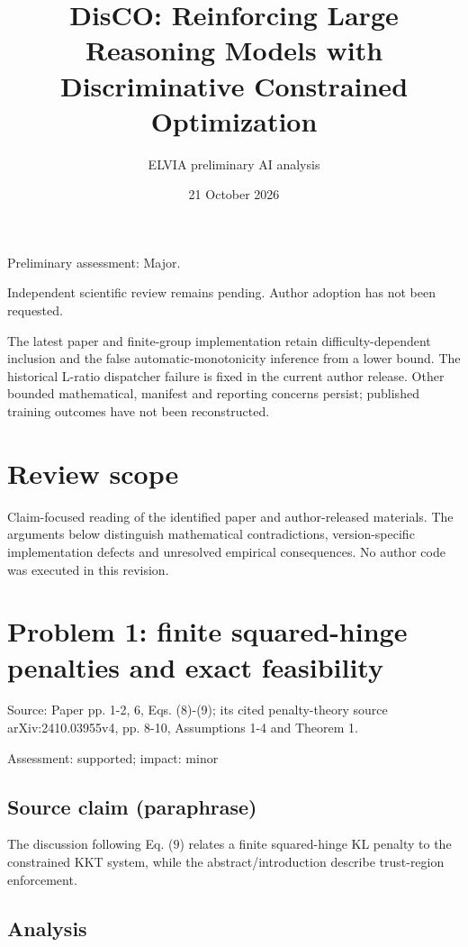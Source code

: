 \documentclass[11pt]{article}
\begin{document}
\title{DisCO: Reinforcing Large Reasoning Models with Discriminative Constrained Optimization}

\author{ELVIA preliminary AI analysis}\date{21 October 2026}\maketitle

Preliminary assessment: Major.\par

Independent scientific review remains pending. Author adoption has not been requested.

The latest paper and finite-group implementation retain difficulty-dependent inclusion and the false automatic-monotonicity inference from a lower bound. The historical L-ratio dispatcher failure is fixed in the current author release. Other bounded mathematical, manifest and reporting concerns persist; published training outcomes have not been reconstructed.

\section*{Review scope}

Claim-focused reading of the identified paper and author-released materials. The arguments below distinguish mathematical contradictions, version-specific implementation defects and unresolved empirical consequences. No author code was executed in this revision.

\section*{Problem 1: finite squared-hinge penalties and exact feasibility}

Source: Paper pp. 1-2, 6, Eqs. (8)-(9); its cited penalty-theory source arXiv:2410.03955v4, pp. 8-10, Assumptions 1-4 and Theorem 1.

Assessment: supported; impact: minor

\subsection*{Source claim (paraphrase)}

The discussion following Eq. (\(9\)) relates a finite squared-hinge KL penalty to the constrained KKT system, while the abstract/introduction describe trust-region enforcement.

\subsection*{Analysis}
\end{document}
